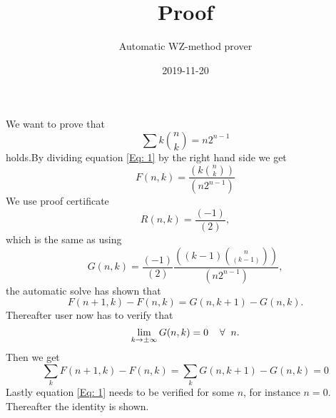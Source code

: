 \documentclass{article}
\title{Proof}
\author{Automatic WZ-method prover}
\date{2019-11-20}
\let\oldforall\forall
\renewcommand{\forall}{\hspace*{2mm}\oldforall\hspace*{1mm}}
\begin{document}
\maketitle
We want to prove that
\begin{equation}\label{Eq: 1}
\sum k\binom{n}{k} = n2^{n-1}
\end{equation}
holds.By dividing equation \ref{Eq: 1} by the right hand side we get
\begin{equation}
F(n,k)=\frac{(k\binom{n}{k})}{(n2^{n-1})}
\end{equation}
We use proof certificate
\begin{equation}
R(n,k)=\frac{(-1)}{(2)},
\end{equation}
which is the same as using
\begin{equation}
G(n,k)=\frac{(-1)}{(2)}\frac{((k-1)\binom{n}{(k-1)})}{(n2^{n-1})},
\end{equation}
the automatic solve has  shown that
\begin{equation}\label{Eq: WZ1}
F(n+1,k)-F(n,k)=G(n,k+1)-G(n,k).
\end{equation}
Thereafter user now has to verify that
\begin{equation}
\lim_{k\to\pm\infty}G(n,k)=0\forall n.
\end{equation}
Then we get
\begin{equation}
\sum_k F(n+1,k)-F(n,k)=\sum_k G(n,k+1)-G(n,k)=0\end{equation}Lastly equation \ref{Eq: 1} needs to be verified for some $n$, for instance $n=0$. Thereafter the identity is shown.
\end{document}
